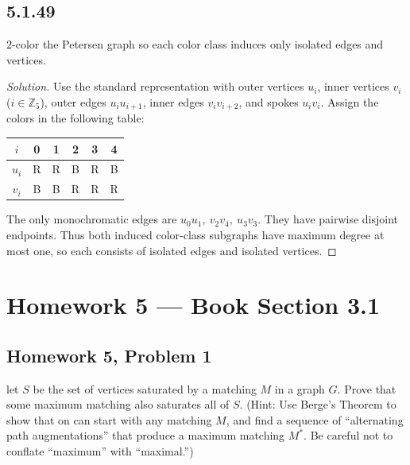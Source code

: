\documentclass[12pt]{amsart}
\newenvironment{solution}{\begin{proof}[Solution]}{\end{proof}}
\begin{document}
    \subsection*{5.1.49} $2$-color the Petersen graph so each color class induces only isolated edges and vertices.
    \begin{solution}Use the standard representation with outer vertices $u_i$, inner vertices $v_i$ ($i\in\mathbb Z_5$), outer edges $u_iu_{i+1}$, inner edges $v_iv_{i+2}$, and spokes $u_iv_i$. Assign the colors in the following table:
        \begin{center}\begin{tabular}{c|ccccc}
                          $i$&0&1&2&3&4\\\hline
                          $u_i$&R&R&B&R&B\\
                          $v_i$&B&B&R&R&R\\
            \end{tabular}\end{center}
        The only monochromatic edges are $u_0u_1,\ v_2v_4,\ u_3v_3$. They have pairwise disjoint endpoints. Thus both induced color-class subgraphs have maximum degree at most one, so each consists of isolated edges and isolated vertices.\end{solution}

    \clearpage
    \section*{Homework 5 --- Book Section 3.1}

    \subsection*{Homework 5, Problem 1} let $S$ be the set of vertices saturated by a matching $M$ in a graph $G$.
    Prove that some maximum matching also saturates all of $S$.
    (Hint: Use Berge's Theorem to show that on can start with any matching $M$, and find a sequence of
    ``alternating path augmentations'' that produce a maximum matching $M^*$.
    Be careful not to conflate ``maximum'' with ``maximal.'')
\end{document}
